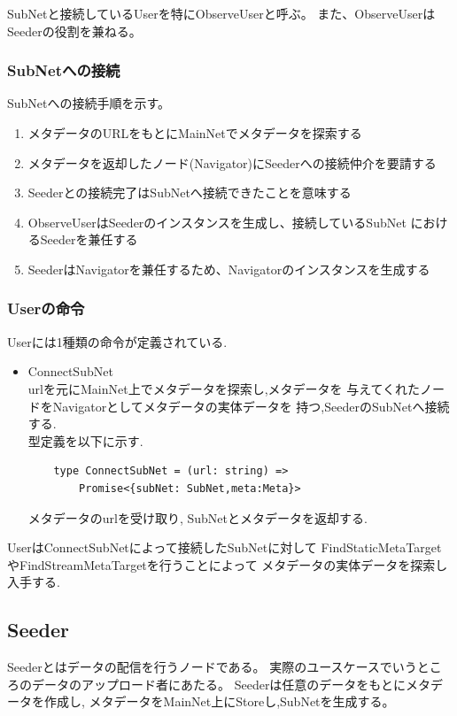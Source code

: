 \documentclass[sotsuron]{jcsie}
\begin{document}
SubNetと接続しているUserを特にObserveUserと呼ぶ。
また、ObserveUserはSeederの役割を兼ねる。

\subsubsection{SubNetへの接続}
SubNetへの接続手順を示す。
\begin{enumerate}
	\item メタデータのURLをもとにMainNetでメタデータを探索する
	\item メタデータを返却したノード(Navigator)にSeederへの接続仲介を要請する
	\item Seederとの接続完了はSubNetへ接続できたことを意味する
	\item 
	ObserveUserはSeederのインスタンスを生成し、接続しているSubNet
	におけるSeederを兼任する
	\item SeederはNavigatorを兼任するため、Navigatorのインスタンスを生成する
\end{enumerate}

\subsubsection{Userの命令}
Userには1種類の命令が定義されている.
\begin{itemize}
	\item {ConnectSubNet}\\
	      urlを元にMainNet上でメタデータを探索し,メタデータを
	      与えてくれたノードをNavigatorとしてメタデータの実体データを
	      持つ,SeederのSubNetへ接続する.\\
	      	      
	      型定義を以下に示す.
	      \begin{lstlisting}
	type ConnectSubNet = (url: string) =>
		Promise<{subNet: SubNet,meta:Meta}>
	      \end{lstlisting}
	      	      
	      メタデータのurlを受け取り,
	      SubNetとメタデータを返却する.		
\end{itemize}

UserはConnectSubNetによって接続したSubNetに対して
FindStaticMetaTargetやFindStreamMetaTargetを行うことによって
メタデータの実体データを探索し入手する.

\subsection{Seeder}
Seederとはデータの配信を行うノードである。
実際のユースケースでいうところのデータのアップロード者にあたる。
Seederは任意のデータをもとにメタデータを作成し,
メタデータをMainNet上にStoreし,SubNetを生成する。
\end{document}
